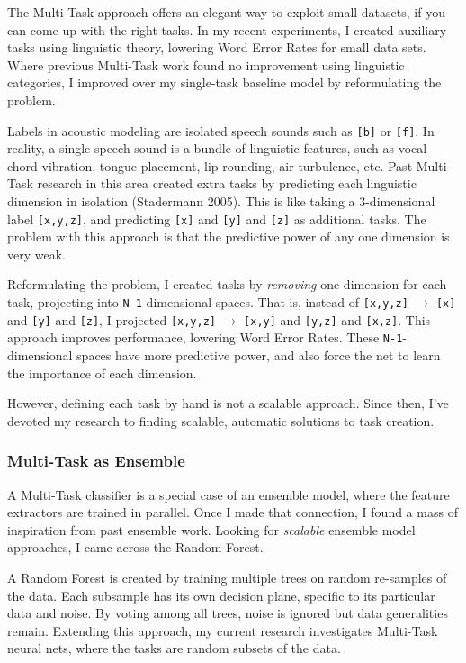 \documentclass[12pt,a4paper]{article}
\begin{document}
The Multi-Task approach offers an elegant way to exploit small datasets, if you can come up with the right tasks. In my recent experiments, I created auxiliary tasks using linguistic theory, lowering Word Error Rates for small data sets. Where previous Multi-Task work found no improvement using linguistic categories, I improved over my single-task baseline model by reformulating the problem.

Labels in acoustic modeling are isolated speech sounds such as \texttt{[b]} or \texttt{[f]}. In reality, a single speech sound is a bundle of linguistic features, such as vocal chord vibration, tongue placement, lip rounding, air turbulence, etc. Past Multi-Task research in this area created extra tasks by predicting each linguistic dimension in isolation (Stadermann 2005). This is like taking a 3-dimensional label \texttt{[x,y,z]}, and predicting \texttt{[x]} and \texttt{[y]} and \texttt{[z]} as additional tasks. The problem with this approach is that the predictive power of any one dimension is very weak.

Reformulating the problem, I created tasks by \textit{removing} one dimension for each task, projecting into \texttt{N-1}-dimensional spaces. That is, instead of \texttt{[x,y,z]} $\rightarrow$ \texttt{[x]} and \texttt{[y]} and \texttt{[z]}, I projected \texttt{[x,y,z]} $\rightarrow$ \texttt{[x,y]} and \texttt{[y,z]} and \texttt{[x,z]}. This approach improves performance, lowering Word Error Rates. These \texttt{N-1}-dimensional spaces have more predictive power, and also force the net to learn the importance of each dimension.

However, defining each task by hand is not a scalable approach. Since then, I've devoted my research to finding scalable, automatic solutions to task creation.

\subsubsection*{Multi-Task as Ensemble}

A Multi-Task classifier is a special case of an ensemble model, where the feature extractors are trained in parallel. Once I made that connection, I found a mass of inspiration from past ensemble work. Looking for \textit{scalable} ensemble model approaches, I came across the Random Forest.

A Random Forest is created by training multiple trees on random re-samples of the data. Each subsample has its own decision plane, specific to its particular data and noise. By voting among all trees, noise is ignored but data generalities remain. Extending this approach, my current research investigates Multi-Task neural nets, where the tasks are random subsets of the data.
\end{document}
